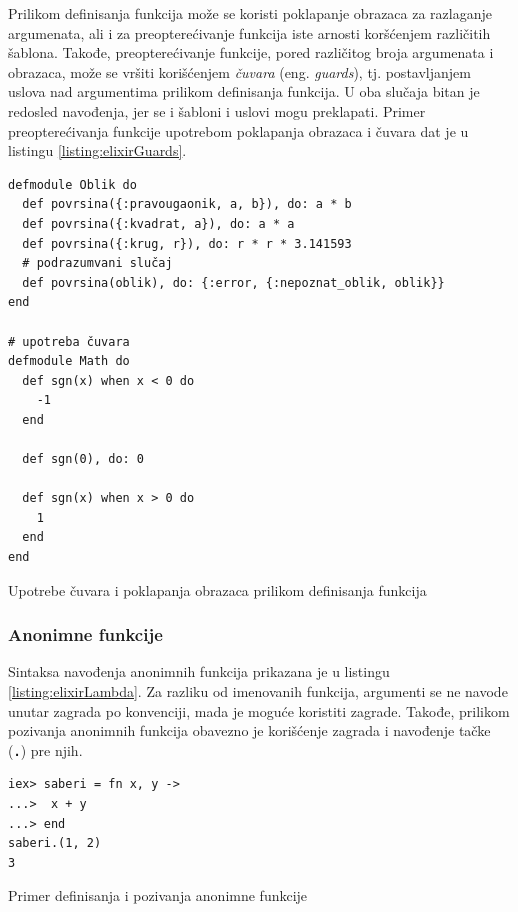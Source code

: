 \documentclass[12pt,oneside]{memoir}
\begin{document}
Prilikom definisanja funkcija može se koristi poklapanje obrazaca za razlaganje argumenata,
ali i za preopterećivanje funkcija iste arnosti koršćenjem različitih šablona. Takođe,
preopterećivanje funkcije, pored različitog broja argumenata i obrazaca, može se vršiti 
korišćenjem \emph{čuvara} (eng. \emph{guards}), tj. postavljanjem uslova nad argumentima
prilikom definisanja funkcija. U oba slučaja bitan je redosled navođenja, jer se i šabloni
i uslovi mogu preklapati. Primer preopterećivanja funkcije upotrebom poklapanja obrazaca
i čuvara dat je u listingu \ref{listing:elixirGuards}.
\begin{listing}[!h]
\begin{verbatim}
defmodule Oblik do
  def povrsina({:pravougaonik, a, b}), do: a * b
  def povrsina({:kvadrat, a}), do: a * a
  def povrsina({:krug, r}), do: r * r * 3.141593
  # podrazumvani slučaj
  def povrsina(oblik), do: {:error, {:nepoznat_oblik, oblik}}
end

# upotreba čuvara
defmodule Math do
  def sgn(x) when x < 0 do
    -1
  end
  
  def sgn(0), do: 0
  
  def sgn(x) when x > 0 do
    1
  end 
end
\end{verbatim}
\caption{Upotrebe čuvara i poklapanja obrazaca prilikom definisanja funkcija}
\label{listing:elixirGuards}
\end{listing}
\subsubsection{Anonimne funkcije}
Sintaksa navođenja anonimnih funkcija prikazana je u listingu \ref{listing:elixirLambda}. Za
razliku od imenovanih funkcija, argumenti se ne navode unutar zagrada po konvenciji, mada je
moguće koristiti zagrade. Takođe, prilikom pozivanja anonimnih funkcija obavezno je korišćenje
zagrada i navođenje tačke (\texttt{\textbf{.}}) pre njih. 
\begin{listing}[!h]
\begin{verbatim}
iex> saberi = fn x, y ->
...>  x + y
...> end
saberi.(1, 2)
3
\end{verbatim}
\caption{Primer definisanja i pozivanja anonimne funkcije}
\label{listing:elixirLambda}
\end{listing}
\end{document}
